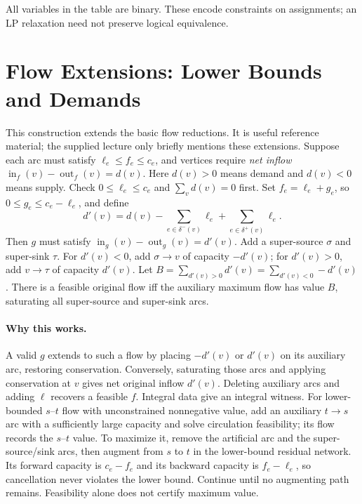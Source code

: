 \documentclass[10pt]{article}
\theoremstyle{definition}
\begin{document}
All variables in the table are binary. These encode constraints on assignments; an LP relaxation need not preserve logical equivalence.


\clearpage

\section{Flow Extensions: Lower Bounds and Demands}\label{nf:demands}
This construction extends the basic flow reductions. It is useful reference
material; the supplied lecture only briefly mentions these extensions.
Suppose each arc must satisfy $\ell_e\le f_e\le c_e$, and vertices require
\emph{net inflow} $\operatorname{in}_f(v)-\operatorname{out}_f(v)=d(v)$.
Here $d(v)>0$ means demand and $d(v)<0$ means supply. Check
$0\le\ell_e\le c_e$ and $\sum_v d(v)=0$ first.
Set $f_e=\ell_e+g_e$, so $0\le g_e\le c_e-\ell_e$, and define
\[
 d'(v)=d(v)-\sum_{e\in\delta^-(v)}\ell_e
                  +\sum_{e\in\delta^+(v)}\ell_e.
\]
Then $g$ must satisfy $\operatorname{in}_g(v)-\operatorname{out}_g(v)=d'(v)$.
Add a super-source $\sigma$ and super-sink $\tau$. For $d'(v)<0$, add
$\sigma\to v$ of capacity $-d'(v)$; for $d'(v)>0$, add $v\to\tau$ of
capacity $d'(v)$. Let
$B=\sum_{d'(v)>0}d'(v)=\sum_{d'(v)<0}-d'(v)$.
There is a feasible original flow iff the auxiliary maximum flow has value
$B$, saturating all super-source and super-sink arcs.

\paragraph{Why this works.}
A valid $g$ extends to such a flow by placing $-d'(v)$ or $d'(v)$ on its
auxiliary arc, restoring conservation. Conversely, saturating those arcs
and applying conservation at $v$ gives net original inflow $d'(v)$.
Deleting auxiliary arcs and adding $\ell$ recovers a feasible $f$.
Integral data give an integral witness. For lower-bounded $s$--$t$ flow with
unconstrained nonnegative value, add an auxiliary $t\to s$ arc with a
sufficiently large capacity and solve circulation feasibility; its flow
records the $s$--$t$ value. To maximize it, remove the artificial arc and the
super-source/sink arcs, then augment from $s$ to $t$ in the lower-bound residual
network. Its forward capacity is $c_e-f_e$ and its backward capacity is
$f_e-\ell_e$, so cancellation never violates the lower bound. Continue until no
augmenting path remains. Feasibility alone does not certify maximum value.


\clearpage
\end{document}
